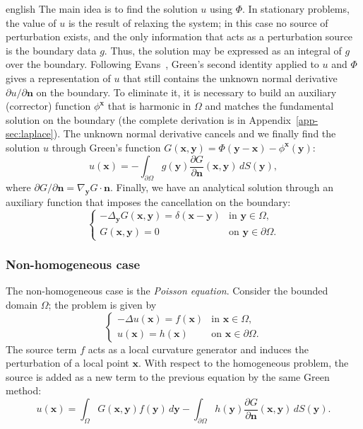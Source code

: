 \documentclass[0000.tex]{subfiles}
\begin{document}
\begin{hyphenrules}{english}
The main idea is to find the solution $u$ using $\Phi$. In stationary problems, the value of $u$ is the
result of relaxing the system; in this case no source of perturbation exists, and the only information
that acts as a perturbation source is the boundary data $g$. Thus, the solution may be expressed as an
integral of $g$ over the boundary. Following Evans~\cite{evans2010}, Green's second identity applied to
$u$ and $\Phi$ gives a representation of $u$ that still contains the unknown normal derivative
$\partial u/\partial\mathbf{n}$ on the boundary. To eliminate it, it is necessary to build an auxiliary
(corrector) function $\phi^{\mathbf{x}}$ that is harmonic in $\Omega$ and matches the fundamental solution on
the boundary (the complete derivation is in Appendix~\ref{app-sec:laplace}). The unknown normal derivative
cancels and we finally find the solution $u$ through Green's function
$G(\mathbf{x},\mathbf{y})=\Phi(\mathbf{y}-\mathbf{x})-\phi^{\mathbf{x}}(\mathbf{y})$:
\begin{equation}
  u(\mathbf{x})=-\int_{\partial\Omega}g(\mathbf{y})\frac{\partial G}{\partial\mathbf{n}}(\mathbf{x},\mathbf{y})\,d S(\mathbf{y}),
  \label{eq:laplace-green}
\end{equation}
where $\partial G/\partial\mathbf{n}=\nabla_{\mathbf{y}}G\cdot\mathbf{n}$. Finally, we have an analytical solution through an
auxiliary function that imposes the cancellation on the boundary:
\begin{equation}
  \begin{cases}
    -\Delta_{\mathbf{y}}G(\mathbf{x},\mathbf{y})=\delta(\mathbf{x}-\mathbf{y}) & \text{in } \mathbf{y}\in\Omega,\\
    G(\mathbf{x},\mathbf{y})=0 & \text{on } \mathbf{y}\in\partial\Omega.
  \end{cases}
  \label{eq:green-function}
\end{equation}

\subsubsection{Non-homogeneous case}
The non-homogeneous case is the \emph{Poisson equation}. Consider the bounded domain $\Omega$; the
problem is given by
\begin{equation}
  \begin{cases}
    -\Delta u(\mathbf{x})=f(\mathbf{x}) & \text{in } \mathbf{x}\in\Omega,\\
    u(\mathbf{x})=h(\mathbf{x}) & \text{on } \mathbf{x}\in\partial\Omega.
  \end{cases}
  \label{eq:poisson}
\end{equation}
The source term $f$ acts as a local curvature generator and induces the perturbation of a local point
$\mathbf{x}$. With respect to the homogeneous problem, the source is added as a new term to the previous
equation by the same Green method:
\begin{equation}
  u(\mathbf{x})=\int_\Omega G(\mathbf{x},\mathbf{y})f(\mathbf{y})\,d\mathbf{y}-\int_{\partial\Omega}h(\mathbf{y})\frac{\partial G}{\partial\mathbf{n}}(\mathbf{x},\mathbf{y})\,d S(\mathbf{y}).
  \label{eq:poisson-green}
\end{equation}


\end{hyphenrules}
\end{document}
